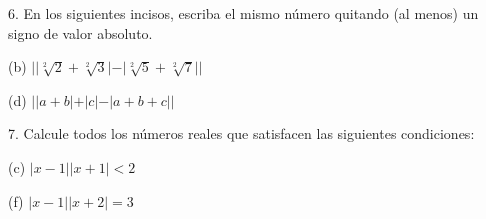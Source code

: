 \documentclass[12pt, a4paper]{article}
\begin{document}
    6. En los siguientes incisos, escriba el mismo número quitando (al menos) un signo de valor absoluto.
    \begin{center}
        (b) $||\sqrt[2]{2} + \sqrt[2]{3}| - |\sqrt[2]{5} + \sqrt[2]{7}|| $

        (d) $||a+b| + |c| - |a+b+c|| $

    \end{center}

    7. Calcule todos los números reales que satisfacen las siguientes condiciones:
    \begin{center}
        (c) $|x-1||x+1| < 2$

        (f) $|x-1||x+2| = 3$
    \end{center}
\end{document}
